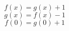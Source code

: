 \documentclass{article}
\begin{document}
\begin{equation} f(x) = g(x) + 1 \end{equation}
\begin{equation} g(x) = f(x) - 1 \end{equation}
\begin{equation} f(0) = g(0) + 1 \end{equation}
\end{document}
